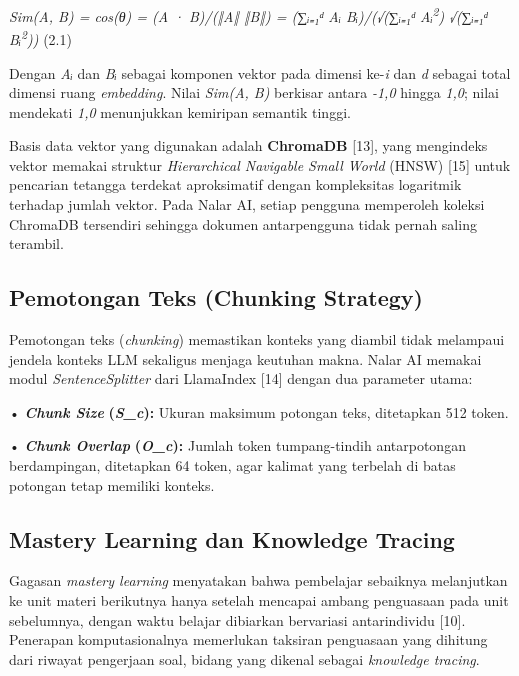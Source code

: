 \documentclass[12pt,a4paper]{article}
\begin{document}
\textit{Sim(A, B) = cos(θ) = (A · B)/(‖A‖ ‖B‖) = (∑ᵢ₌₁ᵈ Aᵢ Bᵢ)/(√(∑ᵢ₌₁ᵈ Aᵢ\textsuperscript{2}) √(∑ᵢ₌₁ᵈ Bᵢ\textsuperscript{2}))}	(2.1)



Dengan \textit{Aᵢ} dan \textit{Bᵢ} sebagai komponen vektor pada dimensi ke-\textit{i} dan \textit{d} sebagai total dimensi ruang \textit{embedding}. Nilai \textit{Sim(A, B)} berkisar antara \textit{-1,0} hingga \textit{1,0}; nilai mendekati \textit{1,0} menunjukkan kemiripan semantik tinggi.



Basis data vektor yang digunakan adalah \textbf{ChromaDB} {[}13{]}, yang mengindeks vektor memakai struktur \textit{Hierarchical Navigable Small World} (HNSW) {[}15{]} untuk pencarian tetangga terdekat aproksimatif dengan kompleksitas logaritmik terhadap jumlah vektor. Pada Nalar AI, setiap pengguna memperoleh koleksi ChromaDB tersendiri sehingga dokumen antarpengguna tidak pernah saling terambil.



\subsection*{Pemotongan Teks (Chunking Strategy)}

Pemotongan teks (\textit{chunking}) memastikan konteks yang diambil tidak melampaui jendela konteks LLM sekaligus menjaga keutuhan makna. Nalar AI memakai modul \textit{SentenceSplitter} dari LlamaIndex {[}14{]} dengan dua parameter utama:



•  \textbf{\textit{Chunk Size}} \textbf{(}\textbf{\textit{S\_c}\textbf{}):} Ukuran maksimum potongan teks, ditetapkan 512 token.



•  \textbf{\textit{Chunk Overlap}} \textbf{(}\textbf{\textit{O\_c}\textbf{}):} Jumlah token tumpang-tindih antarpotongan berdampingan, ditetapkan 64 token, agar kalimat yang terbelah di batas potongan tetap memiliki konteks.



\subsection*{Mastery Learning dan Knowledge Tracing}

Gagasan \textit{mastery learning} menyatakan bahwa pembelajar sebaiknya melanjutkan ke unit materi berikutnya hanya setelah mencapai ambang penguasaan pada unit sebelumnya, dengan waktu belajar dibiarkan bervariasi antarindividu {[}10{]}. Penerapan komputasionalnya memerlukan taksiran penguasaan yang dihitung dari riwayat pengerjaan soal, bidang yang dikenal sebagai \textit{knowledge tracing}.
\end{document}
